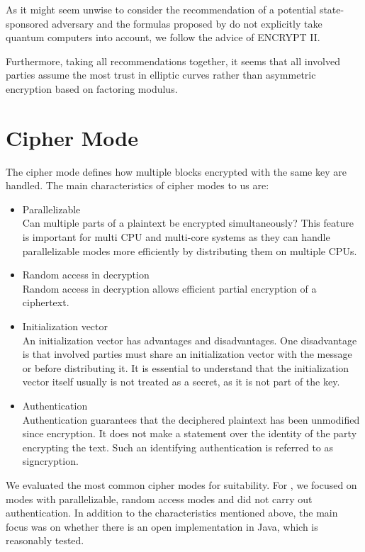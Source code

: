 As it might seem unwise to consider the recommendation of a potential state-sponsored adversary and the formulas proposed by \citeauthor{Lenstra04keylength.} do not explicitly take quantum computers into account, we follow the advice of ENCRYPT II.

Furthermore, taking all recommendations together, it seems that all involved parties assume the most trust in elliptic curves rather than asymmetric encryption based on factoring modulus.

\section{Cipher Mode}
The cipher mode defines how multiple blocks encrypted with the same key are handled. The main characteristics of cipher modes to us are:
\begin{itemize}
	\item Parallelizable\\ 
	Can multiple parts of a plaintext be encrypted simultaneously? This feature is important for multi CPU and multi-core systems as they can handle parallelizable modes more efficiently by distributing them on multiple CPUs.
	\item Random access in decryption\\
	Random access in decryption allows efficient partial encryption of a ciphertext.
	\item Initialization vector\\
	An initialization vector has advantages and disadvantages. One disadvantage is that involved parties must share an initialization vector with the message or before distributing it. It is essential to understand that the initialization vector itself usually is not treated as a secret, as it is not part of the key.
	\item Authentication\\
	Authentication guarantees that the deciphered plaintext has been unmodified since encryption. It does not make a statement over the identity of the party encrypting the text. Such an identifying authentication is referred to as signcryption.
\end{itemize}

We evaluated the most common cipher modes for suitability. For \MessageVortex, we focused on modes with parallelizable, random access modes and did not carry out authentication. In addition to the characteristics mentioned above, the main focus was on whether there is an open implementation in Java, which is reasonably tested.

